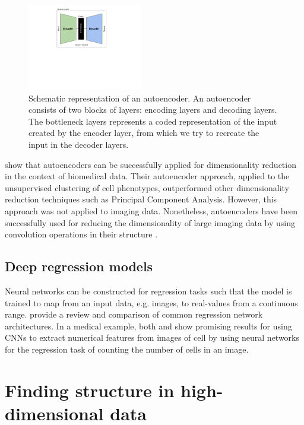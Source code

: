 \begin{figure}[h!]
    \centering
    \includegraphics[width=0.45\textwidth]{dissertation/figures/autoencoder_schema.pdf}
    \caption{Schematic representation of an autoencoder. An autoencoder consists of two blocks of layers: encoding layers and decoding layers. The bottleneck layers represents a coded representation of the input created by the encoder layer, from which we try to recreate the input in the decoder layers.}
    \label{fig:autoencoder}
\end{figure}

\citet{Zamparo2015} show that autoencoders can be successfully applied for dimensionality reduction in the context of biomedical data. Their autoencoder approach, applied to the unsupervised clustering of cell phenotypes, outperformed other dimensionality reduction techniques such as Principal Component Analysis. However, this approach was not applied to imaging data. Nonetheless, autoencoders have been successfully used for reducing the dimensionality of large imaging data by using convolution operations in their structure \citep{saenz2018, wang2016}.

\subsection{Deep regression models}

Neural networks can be constructed for regression tasks such that the model is trained to map from an input data, e.g. images, to real-values from a continuous range. \citet{Lathu2018} provide a review and comparison of common regression network architectures. In a medical example, both \citet{Xie15} and \citet{Xue2017} show promising results for using CNNs to extract numerical features from images of cell by using neural networks for the regression task of counting the number of cells in an image.

\section{Finding structure in high-dimensional data}


